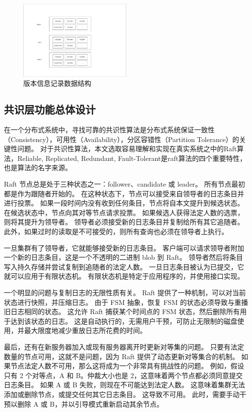 		\begin{figure}[H]
			\centering
			\includegraphics[width=0.50\textwidth]{pdf/manifest.pdf}
			\caption{版本信息记录数据结构}
			\label{radds_storage_manifest}
		\end{figure}
		\subsection{共识层功能总体设计}	
		在一个分布式系统中，寻找可靠的共识性算法是分布式系统保证一致性（Consistency），可用性（Availability），分区容错性（Partition Tolerance）的关键性问题。
		对于共识性算法，本文选取容易理解和实现在真实系统之中的Raft算法，Reliable, Replicated, Redundant, Fault-Tolerant是raft算法的四个重要特性，也是算法的名字来源。
		
		Raft 节点总是处于三种状态之一：follower、candidate 或 leader。 
		所有节点最初都是作为跟随者开始的。 在这种状态下，节点可以接受来自领导者的日志条目并进行投票。 
		如果一段时间内没有收到任何条目，节点将自本文提升到候选状态。 在候选状态中，节点向其对等节点请求投票。 
		如果候选人获得法定人数的选票，则将其提升为领导者。 领导者必须接受新的日志条目并复制给所有其它追随者。 
		此外，如果过时的读取是不可接受的，则所有查询也必须在领导者上执行。
	
		一旦集群有了领导者，它就能够接受新的日志条目。 
		客户端可以请求领导者附加一个新的日志条目，这是一个不透明的二进制 blob 到 Raft。 
		领导者然后将条目写入持久存储并尝试复制到追随者的法定人数。 
		一旦日志条目被认为已提交，它就可以应用于有限状态机。 
		有限状态机是特定于应用程序的，并使用接口实现。
		
		一个明显的问题与复制日志的无限性质有关。 
		Raft 提供了一种机制，可以对当前状态进行快照，并压缩日志。 
		由于 FSM 抽象，恢复 FSM 的状态必须导致与重播旧日志相同的状态。 
		这允许 Raft 捕获某个时间点的 FSM 状态，然后删除所有用于达到该状态的日志。 
		这是自动执行的，无需用户干预，可防止无限制的磁盘使用，并最大限度地减少重放日志所花费的时间。
		
		最后，还有在新服务器加入或现有服务器离开时更新对等集的问题。 
		只要有法定数量的节点可用，这就不是问题，因为 Raft 提供了动态更新对等集合的机制。 
		如果节点法定人数不可用，那么这将成为一个非常具有挑战性的问题。 
		例如，假设只有 2 个对等点，A 和 B。仲裁大小也是 2，这意味着两个节点都必须同意提交日志条目。 
		如果 A 或 B 失败，则现在不可能达到法定人数。 
		这意味着集群无法添加或删除节点，或提交任何其它日志条目。 
		这导致不可用。 此时，需要手动干预以删除 A 或 B，并以引导模式重新启动其余节点。
		
